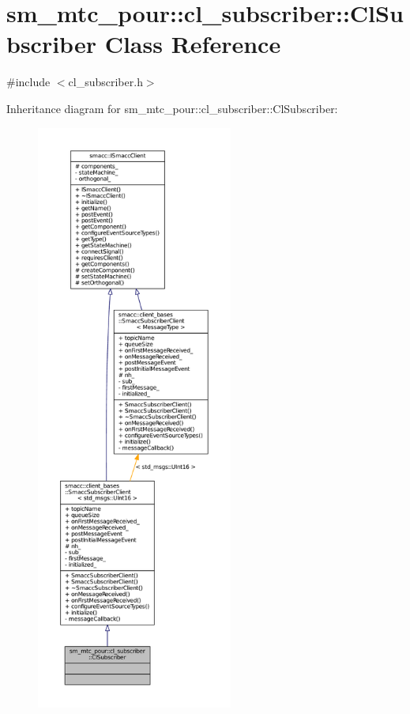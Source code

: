 \hypertarget{classsm__mtc__pour_1_1cl__subscriber_1_1ClSubscriber}{}\section{sm\+\_\+mtc\+\_\+pour\+:\+:cl\+\_\+subscriber\+:\+:Cl\+Subscriber Class Reference}
\label{classsm__mtc__pour_1_1cl__subscriber_1_1ClSubscriber}


{\ttfamily \#include $<$cl\+\_\+subscriber.\+h$>$}



Inheritance diagram for sm\+\_\+mtc\+\_\+pour\+:\+:cl\+\_\+subscriber\+:\+:Cl\+Subscriber\+:
\nopagebreak
\begin{figure}[H]
\begin{center}
\leavevmode
\includegraphics[height=550pt]{classsm__mtc__pour_1_1cl__subscriber_1_1ClSubscriber__inherit__graph}
\end{center}
\end{figure}


